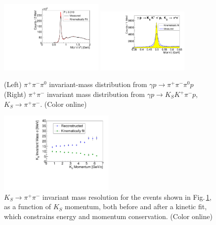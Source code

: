 \begin{figure}[tpb]  
\begin{center}
\includegraphics[width=0.45\textwidth]{figures/omega_inv_mass_probCut_001.pdf}    
\includegraphics[width=0.4\textwidth]{figures/kskpi_mass_spect.pdf}
\caption{\label{fig:invmass1}
(Left) $\pi^+\pi^-\pi^0$ invariant-mass distribution from $\gamma p \to \pi^+\pi^-\pi^0 p$ (Right) $\pi^+\pi^-$ invariant mass distribution from $\gamma p \to K_S K^+ \pi^- p$, $K_S\to\pi^+\pi^-$. (Color online)}
\end{center}
\end{figure}


\begin{figure}[tpb]
\begin{center}\includegraphics[width=0.5\textwidth]{figures/kskpi_mass_resol.pdf}
\caption{\label{fig:invmass1a}
$K_S\to\pi^+\pi^-$ invariant mass resolution for the events shown in Fig.\,\ref{fig:invmass1}, as a function of $K_S$ momentum, both before and after a kinetic fit, which constrains energy and momentum conservation.  
(Color online)}
\end{center}
\end{figure}


